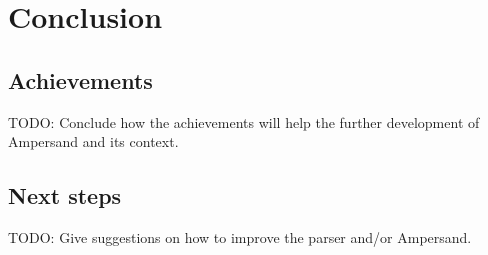 
\section{Conclusion}
\label{sec:conclusion}

\subsection{Achievements}
TODO: Conclude how the achievements will help the further development of Ampersand and its context.

\subsection{Next steps}
TODO: Give suggestions on how to improve the parser and/or Ampersand.